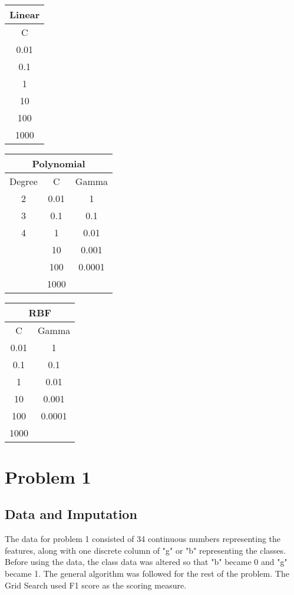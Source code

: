 \documentclass[12pt]{article}
\begin{document}
    \paragraph{}
    \begin{center}
    \begin{tabular}{| c |}
    	\hline Linear \\ \hline
    	C \\ \hline
    	0.01 \\
    	0.1 \\
        1 \\
        10 \\
        100 \\
    	1000 \\ \hline
    \end{tabular}
    \quad
    \begin{tabular}{| c | c | c |}
    	\hline
    	\multicolumn{3}{|c|}{Polynomial} \\ \hline
    	Degree & C & Gamma \\ \hline
    	2 & 0.01 & 1 \\
    	3 & 0.1 & 0.1 \\
    	4 & 1 & 0.01 \\
    	  & 10 & 0.001 \\
    	  & 100 & 0.0001 \\
    	  & 1000 & \\ \hline
    \end{tabular}
    \quad
    \begin{tabular}{| c | c |}
    	\hline
    	\multicolumn{2}{|c|}{RBF} \\ \hline
    	C & Gamma \\ \hline
    	0.01 & 1 \\
    	0.1 & 0.1 \\
    	1 & 0.01 \\
    	10 & 0.001 \\
    	100 & 0.0001 \\
    	1000 & \\ \hline
    \end{tabular}
    \end{center}

    \section{Problem 1}
    
    \subsection{Data and Imputation}
    The data for problem 1 consisted of 34 continuous numbers representing the features, along with one discrete column of "g" or "b" representing the classes. Before using the data, the class data was altered so that "b" became 0 and "g" became 1. The general algorithm was followed for the rest of the problem. The Grid Search used F1 score as the scoring measure.
    
\end{document}
